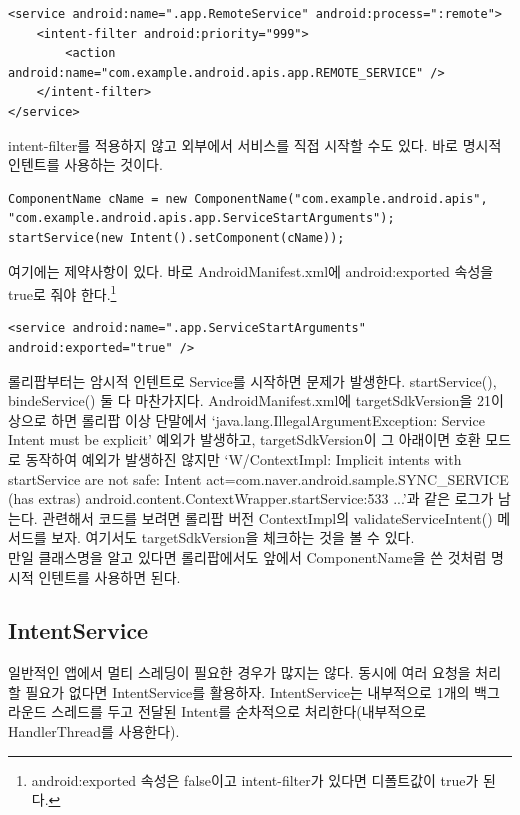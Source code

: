 \begin{lstlisting}[frame=single]
<service android:name=".app.RemoteService" android:process=":remote">
	<intent-filter android:priority="999">
		<action android:name="com.example.android.apis.app.REMOTE_SERVICE" />
	</intent-filter>
</service>
\end{lstlisting}

intent-filter를 적용하지 않고 외부에서 서비스를 직접 시작할 수도 있다. 바로 명시적 인텐트를 사용하는 것이다.
\begin{lstlisting}[frame=single]
ComponentName cName = new ComponentName("com.example.android.apis", "com.example.android.apis.app.ServiceStartArguments");
startService(new Intent().setComponent(cName));
\end{lstlisting}

여기에는 제약사항이 있다. 바로 AndroidManifest.xml에 android:exported 속성을 true로 줘야 한다.\footnote{android:exported 속성은 false이고 intent-filter가 있다면 디폴트값이 true가 된다.}
\begin{lstlisting}[frame=single]
<service android:name=".app.ServiceStartArguments" android:exported="true" />
\end{lstlisting}

롤리팝부터는 암시적 인텐트로 Service를 시작하면 문제가 발생한다. startService(), bindeService() 둘 다 마찬가지다.
AndroidManifest.xml에 targetSdkVersion을 21이상으로 하면 롤리팝 이상 단말에서 `java.lang.IllegalArgu\-mentException: Service Intent must be explicit'  예외가 발생하고, targetSdkVersion이 그 아래이면 호환 모드로 동작하여 예외가 발생하진 않지만 `W/ContextImpl: Implicit intents with startService are not safe: Intent { act=com.naver.android.sample.SYNC\_SERVICE (has extras) } android.content.ContextWrapper.startService:533 ...'과 같은 로그가 남는다. 
관련해서 코드를 보려면 롤리팝 버전 ContextImpl의 validateServiceIntent() 메서드를 보자. 여기서도 targetSdkVersion을 체크하는 것을 볼 수 있다.\\

만일 클래스명을 알고 있다면 롤리팝에서도 앞에서 ComponentName을 쓴 것처럼 명시적 인텐트를 사용하면 된다.

\subsection{IntentService}
일반적인 앱에서 멀티 스레딩이 필요한 경우가 많지는 않다. 동시에 여러 요청을 처리할 필요가 없다면 IntentService를 활용하자.
IntentService는 내부적으로 1개의 백그라운드 스레드를 두고 전달된 Intent를 순차적으로 처리한다(내부적으로 HandlerThread를 사용한다).\\

